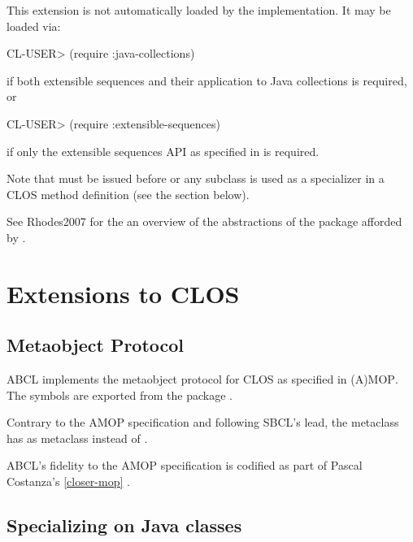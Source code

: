 \documentclass[10pt]{book}
\begin{document}

This extension is not automatically loaded by the implementation.   It
may be loaded via:

\begin{listing-lisp}
CL-USER> (require :java-collections)
\end{listing-lisp}

if both extensible sequences and their application to Java collections
is required, or

\begin{listing-lisp}
CL-USER> (require :extensible-sequences)
\end{listing-lisp}

if only the extensible sequences API as specified in \cite{RHODES2007} is
required.

Note that  must be issued before
 or any subclass is used as a specializer in a \textsc{CLOS}
method definition (see the section below).

See Rhodes2007 \cite{RHODES2007} for the an overview of the
abstractions of the  package afforded by
.

\section{Extensions to CLOS}

\subsection{Metaobject Protocol}

\textsc{ABCL} implements the metaobject protocol for \textsc{CLOS} as
specified in \textsc{(A)MOP}.  The symbols are exported from the
package .

Contrary to the AMOP specification and following \textsc{SBCL}'s lead,
the metaclass  has
 as metaclass instead of
.

\textsc{ABCL}'s fidelity to the AMOP specification is codified as part
of Pascal Costanza's  \ref{closer-mop} \cite{closer-mop}.

\subsection{Specializing on Java classes}
\end{document}
